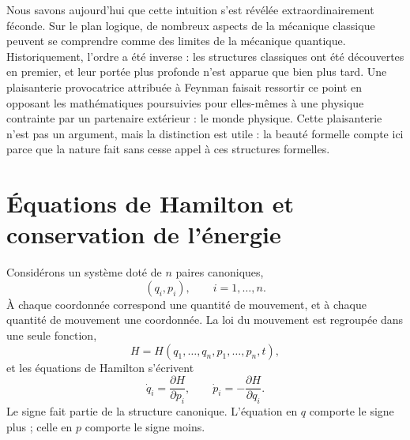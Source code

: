 Nous savons aujourd’hui que cette intuition s’est révélée extraordinairement féconde. Sur le plan logique, de nombreux aspects de la mécanique classique peuvent se comprendre comme des limites de la mécanique quantique. Historiquement, l’ordre a été inverse : les structures classiques ont été découvertes en premier, et leur portée plus profonde n’est apparue que bien plus tard. Une plaisanterie provocatrice attribuée à Feynman faisait ressortir ce point en opposant les mathématiques poursuivies pour elles-mêmes à une physique contrainte par un partenaire extérieur : le monde physique. Cette plaisanterie n’est pas un argument, mais la distinction est utile : la beauté formelle compte ici parce que la nature fait sans cesse appel à ces structures formelles.

\begin{classroomqa}
\end{classroomqa}

\section{Équations de Hamilton et conservation de l’énergie}

Considérons un système doté de \(n\) paires canoniques,
\begin{equation}
  (q_i,p_i),\qquad i=1,\ldots,n.
  \label{eq:l7-canonical-pairs}
\end{equation}
À chaque coordonnée correspond une quantité de mouvement, et à chaque quantité de mouvement une coordonnée. La loi du mouvement est regroupée dans une seule fonction,
\begin{equation}
  H=H(q_1,\ldots,q_n,p_1,\ldots,p_n,t),
  \label{eq:l7-hamiltonian}
\end{equation}
et les équations de Hamilton s’écrivent
\begin{equation}
  \boxed{
  \dot q_i=\frac{\partial H}{\partial p_i},
  \qquad
  \dot p_i=-\frac{\partial H}{\partial q_i}.}
  \label{eq:l7-hamilton-equations}
\end{equation}
Le signe fait partie de la structure canonique. L’équation en \(q\) comporte le signe plus ; celle en \(p\) comporte le signe moins.

